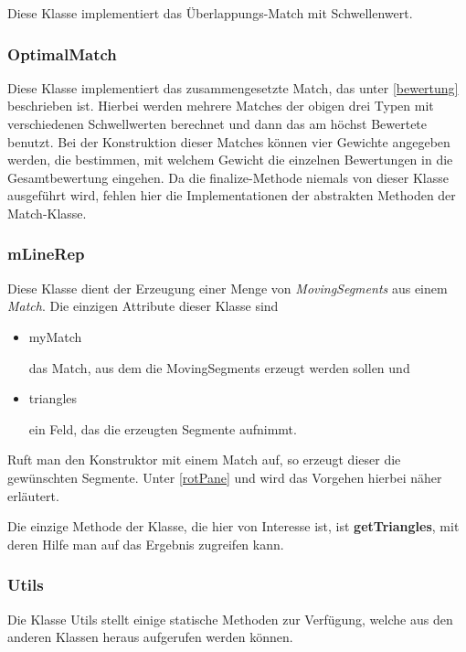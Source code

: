 Diese Klasse implementiert das Überlappungs-Match mit Schwellenwert.

\subsubsection{OptimalMatch}

Diese Klasse implementiert das zusammengesetzte Match, das unter \vref{bewertung} beschrieben ist. Hierbei werden mehrere Matches der obigen drei Typen mit verschiedenen Schwellwerten berechnet und dann das am höchst Bewertete benutzt. Bei der Konstruktion dieser Matches können vier Gewichte angegeben werden, die bestimmen, mit welchem Gewicht die einzelnen Bewertungen in die Gesamtbewertung eingehen. Da die finalize-Methode niemals von dieser Klasse ausgeführt wird, fehlen hier die Implementationen der abstrakten Methoden der Match-Klasse.

\subsubsection{mLineRep}

Diese Klasse dient der Erzeugung einer Menge von \textit{MovingSegments} aus einem \textit{Match}. Die einzigen Attribute dieser Klasse sind
\begin{itemize}

\item  myMatch

das Match, aus dem die MovingSegments erzeugt werden sollen und

\item triangles

ein Feld, das die erzeugten Segmente aufnimmt.

\end{itemize}

Ruft man den Konstruktor mit einem Match auf, so erzeugt dieser die gewünschten Segmente. Unter \vref{rotPane} und  wird das Vorgehen hierbei näher erläutert.

Die einzige Methode der Klasse, die hier von Interesse ist, ist \textbf{getTriangles}, mit deren Hilfe man auf das Ergebnis zugreifen kann.

\subsubsection{Utils}

Die Klasse Utils stellt einige statische Methoden zur Verfügung, welche aus den anderen Klassen heraus aufgerufen werden können.


